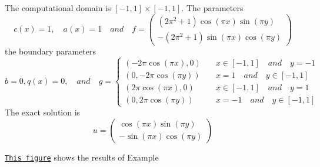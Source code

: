 The computational domain is $[-1,1]\times [-1,1]$. The parameters \[ c(x) = 1 ,\quad a(x) = 1 \quad and \quad f = \left( \begin{array}{l} (2\pi^2+1)\cos(\pi x)\sin(\pi y)\\ -(2\pi^2+1)\sin(\pi x)\cos(\pi y) \end{array}\right) \] the boundary parameters \[ b = 0, q(x) = 0 ,\quad and \quad g = \left\{ \begin{array}{ll} (-2\pi \cos(\pi x),0) &\quad x \in [-1,1] \quad and \quad y=-1 \\ (0,-2\pi \cos(\pi y)) &\quad x = 1 \quad and \quad y \in [-1,1] \\ (2\pi \cos(\pi x),0) &\quad x \in [-1,1] \quad and \quad y=1 \\ (0,2\pi \cos(\pi y)) &\quad x = -1 \quad and \quad y \in [-1,1] \end{array}\right. \] The exact solution is \[ u=\left( \begin{array}{l} \cos(\pi x)\sin(\pi y)\\ -\sin(\pi x)\cos(\pi y) \end{array}\right) \]

\href{../../example2.tiff}{\tt This figure} shows the results of Example 